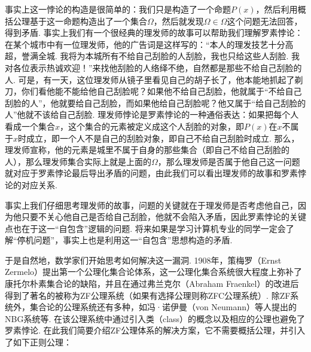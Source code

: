 事实上这一悖论的构造是很简单的：我们只是构造了一个命题$P(x)$，然后利用概括公理基于这一命题构造出了一个集合$\Omega$，然后就发现$\Omega\in\Omega$这个问题无法回答，得到矛盾. 事实上我们有一个很经典的理发师的故事可以帮助我们理解罗素悖论：在某个城市中有一位理发师，他的广告词是这样写的：``本人的理发技艺十分高超，誉满全城. 我将为本城所有不给自己刮脸的人刮脸，我也只给这些人刮脸. 我对各位表示热诚欢迎！''来找他刮脸的人络绎不绝，自然都是那些不给自己刮脸的人. 可是，有一天，这位理发师从镜子里看见自己的胡子长了，他本能地抓起了剃刀，你们看他能不能给他自己刮脸呢？如果他不给自己刮脸，他就属于``不给自己刮脸的人''，他就要给自己刮脸，而如果他给自己刮脸呢？他又属于``给自己刮脸的人''他就不该给自己刮脸. 理发师悖论是罗素悖论的一种通俗表达：如果把每个人看成一个集合$x$，这个集合的元素被定义成这个人刮脸的对象，即$P(x)$在$x$不属于$x$时成立，即一个人不是自己的刮脸对象，即自己不给自己刮脸时成立. 那么，理发师宣称，他的元素是城里不属于自身的那些集合（即自己不给自己刮脸的人），那么理发师集合实际上就是上面的$\Omega$，那么理发师是否属于他自己这一问题就对应于罗素悖论最后导出矛盾的问题，由此我们可以看出理发师的故事和罗素悖论的对应关系.

事实上我们仔细思考理发师的故事，问题的关键就在于理发师是否考虑他自己，因为他只要不关心他自己是否给自己刮脸，他就不会陷入矛盾，因此罗素悖论的关键点也在于这一``自包含''逻辑的问题. 将来如果是学习计算机专业的同学一定会了解``停机问题''，事实上也是利用这一``自包含''思想构造的矛盾.

于是自然地，数学家们开始思考如何解决这一漏洞. 1908年，策梅罗（Ernst Zermelo）提出第一个公理化集合论体系，这一公理化集合系统很大程度上弥补了康托尔朴素集合论的缺陷，并且在通过弗兰克尔（Abraham Fraenkel）的改进后得到了著名的被称为ZF公理系统（如果有选择公理则称ZFC公理系统）. 除ZF系统外，集合论的公理系统还有多种，如冯·诺伊曼（von Neumann）等人提出的NBG系统等. 在该公理系统中通过引入类（class）的概念以及相应的公理也避免了罗素悖论. 在此我们简要介绍ZF公理体系的解决方案，它不需要概括公理，并引入了如下正则公理：




